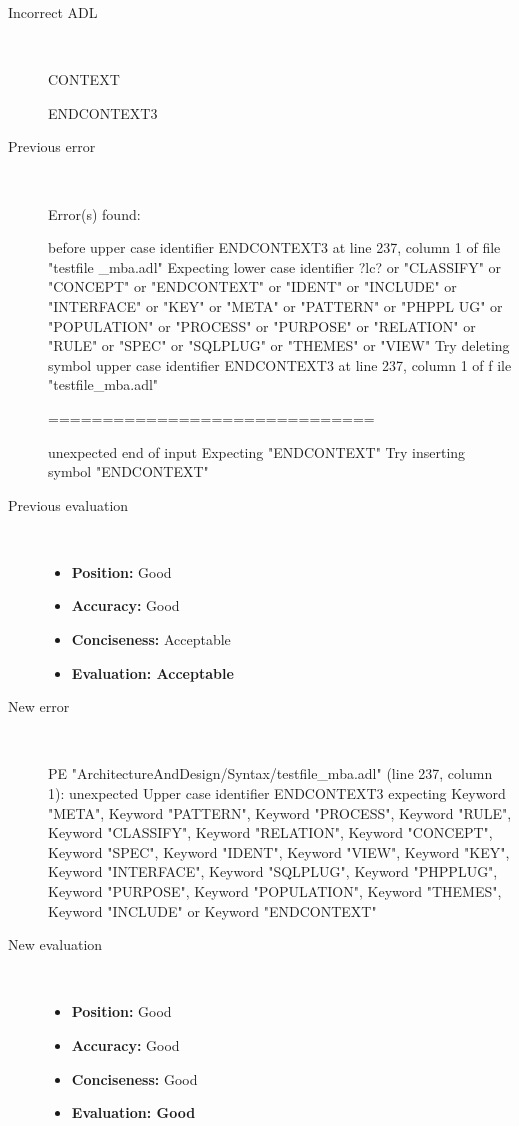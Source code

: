 \hrulefill

\begin{description}
  \item[Incorrect ADL]~\\
\begin{adl}
CONTEXT

ENDCONTEXT3\end{adl}
  \item[Previous error]~\\
\begin{haskell}
Error(s) found:

before upper case identifier ENDCONTEXT3 at line 237, column 1 of file "testfile
_mba.adl"
Expecting lower case identifier ?lc? or "CLASSIFY" or "CONCEPT" or "ENDCONTEXT"
or "IDENT" or "INCLUDE" or "INTERFACE" or "KEY" or "META" or "PATTERN" or "PHPPL
UG" or "POPULATION" or "PROCESS" or "PURPOSE" or "RELATION" or "RULE" or "SPEC"
or "SQLPLUG" or "THEMES" or "VIEW"
Try deleting symbol upper case identifier ENDCONTEXT3 at line 237, column 1 of f
ile "testfile_mba.adl"

==============================

unexpected end of input
Expecting "ENDCONTEXT"
Try inserting symbol "ENDCONTEXT"
\end{haskell}
  \item[Previous evaluation]~\\
    \begin{itemize}
    \item \textbf{Position:} Good
    \item \textbf{Accuracy:} Good
    \item \textbf{Conciseness:} Acceptable
    \item \textbf{Evaluation: Acceptable}
    \end{itemize}
  \item[New error]~\\
\begin{haskell}
PE "ArchitectureAndDesign/Syntax/testfile_mba.adl" (line 237, column 1):
unexpected Upper case identifier ENDCONTEXT3
expecting Keyword "META", Keyword "PATTERN", Keyword "PROCESS", Keyword "RULE", Keyword "CLASSIFY", Keyword "RELATION", Keyword "CONCEPT", Keyword "SPEC", Keyword "IDENT", Keyword "VIEW", Keyword "KEY", Keyword "INTERFACE", Keyword "SQLPLUG", Keyword "PHPPLUG", Keyword "PURPOSE", Keyword "POPULATION", Keyword "THEMES", Keyword "INCLUDE" or Keyword "ENDCONTEXT"
\end{haskell}
  \item[New evaluation]~\\
    \begin{itemize}
    \item \textbf{Position:} Good
    \item \textbf{Accuracy:} Good
    \item \textbf{Conciseness:} Good
    \item \textbf{Evaluation: Good}
    \end{itemize}
  \end{description}

